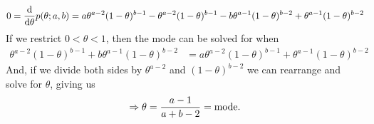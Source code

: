 \documentclass[12pt,letterpaper]{hmcpset}
\begin{document}
\begin{solution}
\begin{align*}
   0 = \dv{\theta}p(\theta; a, b)  = a \theta ^{a-2} (1-\theta )^{b-1}-\theta ^{a-2} (1-\theta )^{b-1}-b \theta ^{a-1}
   (1-\theta )^{b-2}+\theta ^{a-1} (1-\theta )^{b-2}
\end{align*}
If we restrict $0 < \theta < 1$, then the mode can be solved for when   
\begin{align*}
     \theta ^{a-2} (1-\theta )^{b-1}+b \theta ^{a-1}
   (1-\theta )^{b-2} &= a \theta ^{a-2} (1-\theta )^{b-1}+\theta ^{a-1} (1-\theta )^{b-2}
\end{align*}
And, if we divide both sides by $\theta^{a - 2}$ and $(1-\theta)^{b - 2}$ we can rearrange and solve for $\theta$, giving us
\[ \Rightarrow \theta = \frac{a-1}{a + b - 2} = {\rm mode}. \]
\end{solution}
\newpage
\end{document}
